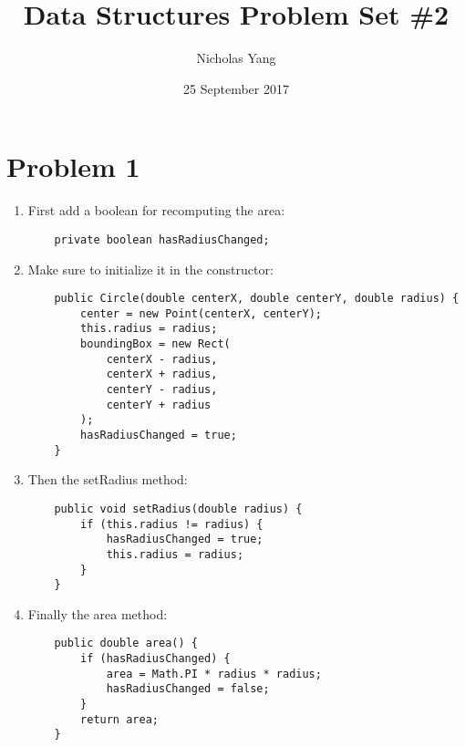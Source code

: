 \documentclass[12pt]{article}
\title{Data Structures Problem Set \#2}
\author{Nicholas Yang}
\date{25 September 2017}
\begin{document}
\maketitle
\section{Problem 1}
\begin{enumerate}[label=(\alph*)]
\item
  First add a boolean for recomputing the area:
  \begin{verbatim}
    private boolean hasRadiusChanged;
  \end{verbatim}
\item Make sure to initialize it in the constructor:
  \begin{verbatim}
    public Circle(double centerX, double centerY, double radius) {
        center = new Point(centerX, centerY);
        this.radius = radius;
        boundingBox = new Rect(
            centerX - radius,
            centerX + radius,
            centerY - radius,
            centerY + radius
        );
        hasRadiusChanged = true;
    }
  \end{verbatim}
\item Then the setRadius method:
  \begin{verbatim}
    public void setRadius(double radius) {
        if (this.radius != radius) {
            hasRadiusChanged = true;
            this.radius = radius;
        }
    }
  \end{verbatim}
\item  Finally the area method:
  \begin{verbatim}
    public double area() {
        if (hasRadiusChanged) {
            area = Math.PI * radius * radius;
            hasRadiusChanged = false;
        }
        return area;
    }
  \end{verbatim}
\end{enumerate}
\end{document}

